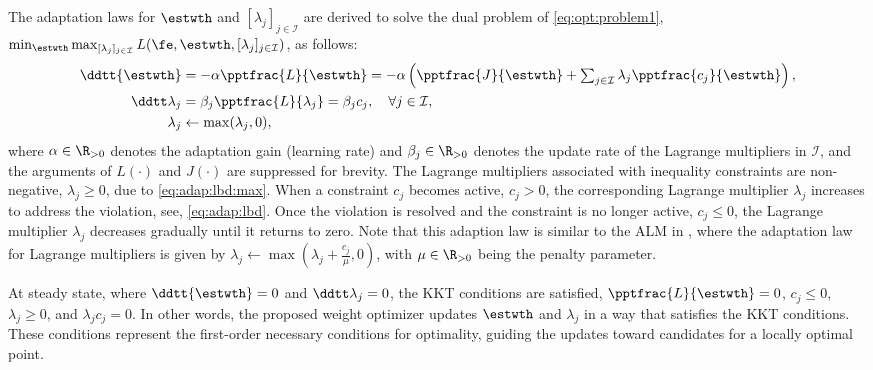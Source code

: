 \documentclass[journal]{IEEEtran}
\begin{document}
The adaptation laws for $\estwth$ and $[\lambda_j]_{j\in\mathcal I}$ are derived to solve the dual problem of \eqref{eq:opt:problem1}, \ie $\min_{\estwth} \max_{[\lambda_j]_{j\in\mathcal I}}L(\fe,\estwth,[\lambda_j]_{j\in\mathcal I})$, as follows:
\begin{subequations}
    \begin{align}
            \ddtt{\estwth}
            &
            =
            -\alpha \pptfrac{L}{\estwth}
            =
            -\alpha 
            \left(
                \pptfrac{J}{\estwth}
                +
                \textstyle\sum_{j\in\mathcal{I}}
                \lambda_j 
                \pptfrac{c_j}{\estwth}
            \right),
        \label{eq:adap:th}
            \\
            \ddtt\lambda_j
            & 
            = 
            \beta_j\pptfrac{L}{\lambda_j} 
            = 
            \beta_j c_j ,
            \quad \forall j\in\mathcal I,
        \label{eq:adap:lbd}
            \\
            \lambda_j & \leftarrow \max(\lambda_j,0) ,
        \label{eq:adap:lbd:max}
    \end{align}
    \label{eq:adaptation law}%
\end{subequations}
where $\alpha\in\R_{>0}$ denotes the adaptation gain (learning rate) and $\beta_j\in\R_{>0}$ denotes the update rate of the Lagrange multipliers in $\mathcal I$, and the arguments of $L(\cdot)$ and $J(\cdot)$ are suppressed for brevity. 
The Lagrange multipliers associated with inequality constraints are non-negative, \ie $\lambda_j\ge 0$, due to \eqref{eq:adap:lbd:max}. 
When a constraint $c_j$ becomes active, \ie $c_j > 0$, the corresponding Lagrange multiplier $\lambda_j$ increases to address the violation, \ie see, \eqref{eq:adap:lbd}.
Once the violation is resolved and the constraint is no longer active, \ie $c_j \le 0$, the Lagrange multiplier $\lambda_j$ decreases gradually until it returns to zero.
Note that this adaption law is similar to the ALM in \cite{Nocedal:2006aa}, where the adaptation law for Lagrange multipliers is given by $\lambda_j\leftarrow \max\left(\lambda_j+\tfrac{c_j}{\mu},0\right)$, with $\mu\in\R_{>0}$ being the penalty parameter. 

At steady state, where $\ddtt{\estwth}=0$ and $\ddtt\lambda_j=0$, the KKT conditions are satisfied, \ie $\pptfrac{L}{\estwth}=0$, $c_j \le 0$, $\lambda_j \ge 0$, and $\lambda_j c_j=0$.
In other words, the proposed weight optimizer updates $\estwth$ and $\lambda_j$ in a way that satisfies the KKT conditions. 
These conditions represent the first-order necessary conditions for optimality, guiding the updates toward candidates for a locally optimal point.
\end{document}
